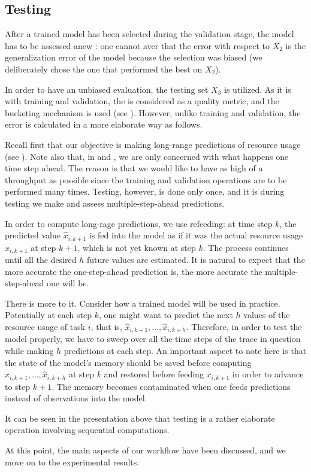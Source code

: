 \subsection{Testing} 
After a trained model has been selected during the validation stage, the model
has to be assessed anew \cite{hastie2009}: one cannot aver that the error with
respect to $X_2$ is the generalization error of the model because the selection
was biased (we deliberately chose the one that performed the best on $X_2$).

In order to have an unbiased evaluation, the testing set $X_3$ is utilized. As
it is with training and validation, the  is considered as a quality
metric, and the bucketing mechanism is used (see ). However,
unlike training and validation, the error is calculated in a more elaborate way
as follows.

Recall first that our objective is making long-range predictions of resource
usage (see ). Note also that, in  and
, we are only concerned with what happens one time step ahead.
The reason is that we would like to have as high of a throughput as possible
since the training and validation operations are to be performed many times.
Testing, however, is done only once, and it is during testing we make and assess
multiple-step-ahead predictions.

In order to compute long-rage predictions, we use refeeding: at time step $k$,
the predicted value $\hat{x}_{i,k + 1}$ is fed into the model as if it was the
actual resource usage $x_{i,k + 1}$ at step $k + 1$, which is not yet known at
step $k$. The process continues until all the desired $h$ future values are
estimated. It is natural to expect that the more accurate the one-step-ahead
prediction is, the more accurate the multiple-step-ahead one will be.

There is more to it. Consider how a trained model will be used in practice.
Potentially at each step $k$, one might want to predict the next $h$ values of
the resource usage of task $i$, that is, $\hat{x}_{i,k + 1}, \dots, \hat{x}_{i,k
+ h}$. Therefore, in order to test the model properly, we have to sweep over all
the time steps of the trace in question while making $h$ predictions at each
step. An important aspect to note here is that the state of the model's memory
should be saved before computing $\hat{x}_{i,k + 1}, \dots, \hat{x}_{i,k + h}$
at step $k$ and restored before feeding $x_{i,k + 1}$ in order to advance to
step $k + 1$. The memory becomes contaminated when one feeds predictions instead
of observations into the model.

It can be seen in the presentation above that testing is a rather elaborate
operation involving sequential computations.

At this point, the main aspects of our workflow have been discussed, and we move
on to the experimental results.
